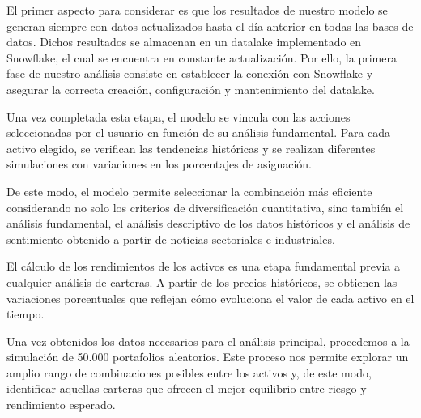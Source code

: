 \documentclass[letterpaper,10pt,spanish]{sphinxmanual}
\begin{document}
\sphinxAtStartPar
El primer aspecto para considerar es que los resultados de nuestro modelo se generan siempre con datos actualizados hasta el día anterior en todas las bases de datos. Dichos resultados se almacenan en un datalake implementado en Snowflake, el cual se encuentra en constante actualización. Por ello, la primera fase de nuestro análisis consiste en establecer la conexión con Snowflake y asegurar la correcta creación, configuración y mantenimiento del datalake.

\sphinxAtStartPar
Una vez completada esta etapa, el modelo se vincula con las acciones seleccionadas por el usuario en función de su análisis fundamental. Para cada activo elegido, se verifican las tendencias históricas y se realizan diferentes simulaciones con variaciones en los porcentajes de asignación.

\sphinxAtStartPar
De este modo, el modelo permite seleccionar la combinación más eficiente considerando no solo los criterios de diversificación cuantitativa, sino también el análisis fundamental, el análisis descriptivo de los datos históricos y el análisis de sentimiento obtenido a partir de noticias sectoriales e industriales.

\sphinxAtStartPar
El cálculo de los rendimientos de los activos es una etapa fundamental previa a cualquier análisis de carteras. A partir de los precios históricos, se obtienen las variaciones porcentuales que reflejan cómo evoluciona el valor de cada activo en el tiempo.

\begin{sphinxVerbatim}[commandchars=\\\{\},numbers=left,firstnumber=1,stepnumber=1]
      
\end{sphinxVerbatim}

\sphinxAtStartPar
Una vez obtenidos los datos necesarios para el análisis principal, procedemos a la simulación de 50.000 portafolios aleatorios. Este proceso nos permite explorar un amplio rango de combinaciones posibles entre los activos y, de este modo, identificar aquellas carteras que ofrecen el mejor equilibrio entre riesgo y rendimiento esperado.
\end{document}
